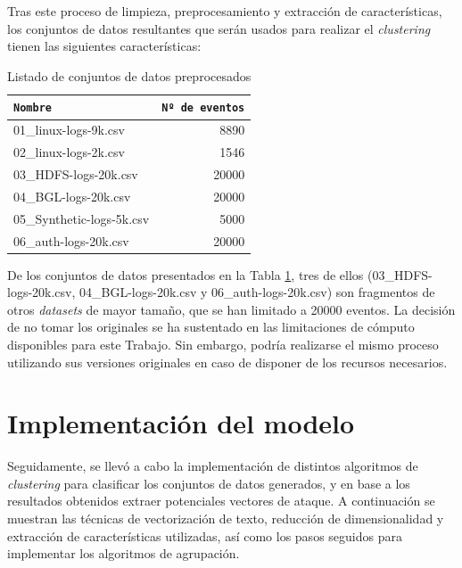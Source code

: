 Tras este proceso de limpieza, preprocesamiento y extracción de características, los conjuntos de datos resultantes que serán usados para realizar el \textit{clustering} tienen las siguientes características:

\begin{table}[H]
\centering
\footnotesize
\begin{tabularx}{\textwidth}{|X|r|}
\hline
\rowcolor{graylight}\texttt{Nombre} & \texttt{Nº de eventos} \\ 
\hline
01\_linux-logs-9k.csv & 8890 \\ 
\hline
02\_linux-logs-2k.csv & 1546 \\ 
\hline
03\_HDFS-logs-20k.csv & 20000 \\ 
\hline
04\_BGL-logs-20k.csv & 20000 \\ 
\hline
05\_Synthetic-logs-5k.csv & 5000 \\
\hline
06\_auth-logs-20k.csv & 20000 \\
\hline
\end{tabularx}
\caption{Listado de conjuntos de datos preprocesados}
\label{tab:conjuntos-datos}
\end{table}

De los conjuntos de datos presentados en la Tabla \ref{tab:conjuntos-datos}, tres de ellos (03\_HDFS-logs-20k.csv, 04\_BGL-logs-20k.csv y 06\_auth-logs-20k.csv) son fragmentos de otros \textit{datasets} de mayor tamaño, que se han limitado a 20000 eventos. La decisión de no tomar los originales se ha sustentado en las limitaciones de cómputo disponibles para este Trabajo. Sin embargo, podría realizarse el mismo proceso utilizando sus versiones originales en caso de disponer de los recursos necesarios.


\newpage

\section{Implementación del modelo}

Seguidamente, se llevó a cabo la implementación de distintos algoritmos de \textit{clustering} para clasificar los conjuntos de datos generados, y en base a los resultados obtenidos extraer potenciales vectores de ataque. A continuación se muestran las técnicas de vectorización de texto, reducción de dimensionalidad y extracción de características utilizadas, así como los pasos seguidos para implementar los algoritmos de agrupación.

